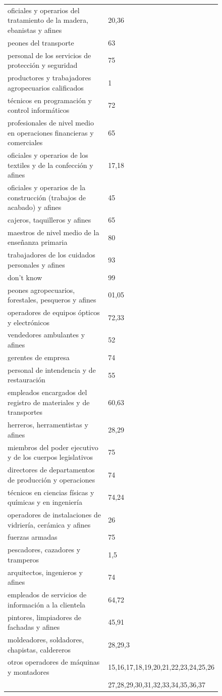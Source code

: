 \documentclass[12pt]{article}
\begin{document}
\begin{figure}[H]
\begin{center}
\begin{tabular}{ll}
oficiales y operarios del tratamiento de la madera, ebanistas y afines & 20,36\\
peones del transporte & 63\\
personal de los servicios de protecci\'{o}n y seguridad & 75\\
productores y trabajadores agropecuarios calificados%
& 1\\
t\'{e}cnicos en programaci\'{o}n y control inform\'{a}ticos & 72\\
profesionales de nivel medio en operaciones financieras y comerciales & 65\\
oficiales y operarios de los textiles y de la confecci\'{o}n y afines & 17,18\\
oficiales y operarios de la construcci\'{o}n (trabajos de acabado) y afines & 45\\
cajeros, taquilleros y afines & 65\\
maestros de nivel medio de la ense\~{n}anza primaria & 80\\
trabajadores de los cuidados personales y afines & 93\\
don't know & 99\\
peones agropecuarios, forestales, pesqueros y afines & 01,05\\
operadores de equipos \'{o}pticos y electr\'{o}nicos & 72,33\\
vendedores ambulantes y afines & 52\\
gerentes de empresa & 74\\
personal de intendencia y de restauraci\'{o}n & 55\\
empleados encargados del registro de materiales y de transportes & 60,63\\
herreros, herramentistas y afines & 28,29 \\
miembros del poder ejecutivo y de los cuerpos legislativos & 75\\
directores de departamentos de producci\'{o}n y operaciones & 74\\
t\'{e}cnicos en ciencias f\'{i}sicas y qu\'{i}micas y en ingenier\'{i}a & 74,24\\
operadores de instalaciones de vidrier\'{i}a, cer\'{a}mica y afines & 26\\
fuerzas armadas & 75\\
pescadores, cazadores y tramperos & 1,5\\
arquitectos, ingenieros y afines & 74\\
empleados de servicios de informaci\'{o}n a la clientela & 64,72\\
pintores, limpiadores de fachadas y afines & 45,91\\
moldeadores, soldadores, chapistas, caldereros%
& 28,29,3\\
otros operadores de m\'{a}quinas y montadores & 15,16,17,18,19,20,21,22,23,24,25,26\\
&27,28,29,30,31,32,33,34,35,36,37
\end{tabular}
\caption{\label{fig:Appendix2}}
\end{center}
\end{figure}
\end{document}
